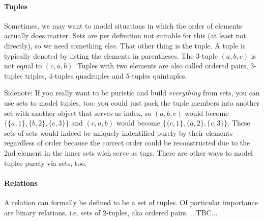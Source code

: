 \paragraph{Tuples}
Sometimes, we may want to model situations in which the order of elements actually does matter. Sets are per definition not suitable for this (at least not directly), so we need something else. That other thing is the tuple. A tuple is typically denoted by listing the elements in parentheses. The 3-tuple $(a,b,c)$ is not equal to $(c,a,b)$. Tuples with two elements are also called ordered pairs, 3-tuples triples, 4-tuples quadruples and 5-tuples quintuples.

\medskip 
Sidenote: If you really want to be puristic and build \emph{everything} from sets, you can use sets to model tuples, too: you could just pack the tuple members into another set with another object that serves as index, so $(a,b,c)$ would become $\{\{a,1\},\{b,2\},\{c,3\}\}$ and $(c,a,b)$ would become  $\{\{c,1\},\{a,2\},\{c,3\}\}$. These sets of sets would indeed be uniquely indentified purely by their elements regardless of order because the correct order could be reconstructed due to the 2nd element in the inner sets wich serve as tags. There are other ways to model tuples purely via sets, too.


\paragraph{Relations}
A relation can formally be defined to be a set of tuples. Of particular importance are binary relations, i.e. sets of 2-tuples, aka ordered pairs. ...TBC...

